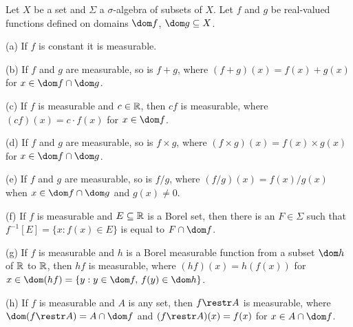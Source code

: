      
Let $X$ be a set and $\Sigma$ a $\sigma$-algebra
of subsets of $X$.   Let $f$ and $g$ be real-valued functions defined on
domains $\dom f$, $\dom g\subseteq X$.
     
(a) If $f$ is constant it is
measurable.
     
(b) If $f$ and $g$ are measurable, so is $f+g$, where
$(f+g)(x)=f(x)+g(x)$ for $x\in
\dom f\cap\dom g$.
     
(c) If $f$ is measurable and $c\in\Bbb R$, then $cf$ is measurable,
where
$(cf)(x)=c\cdot f(x)$ for $x\in \dom f$.
     
(d) If $f$ and $g$ are measurable, so is $f\times g$, where $(f\times
g)(x)=f(x)\times g(x)$ for $x\in \dom f\cap\dom g$.
     
(e) If $f$ and $g$ are measurable, so is $f/g$, where
$(f/g)(x)=f(x)/g(x)$ when
$x\in \dom f\cap\dom g$ and $g(x)\ne 0$.
     
(f) If $f$ is measurable and $E\subseteq\Bbb R$ is a Borel set, then
there is an
$F\in\Sigma$ such that $f^{-1}[E]=\{x:f(x)\in E\}$ is equal to $F\cap
\dom f$.
     
(g) If $f$ is measurable and $h$ is  a Borel measurable function from a
subset $\dom h$
of $\Bbb R$ to $\Bbb R$, then $hf$ is measurable, where
$(hf)(x)=h(f(x))$ for $x\in\dom(hf)=\{y:y\in\dom f,\,f(y)\in\dom h\}$.
     
(h) If $f$ is measurable and $A$ is any set, then $f\restr A$ is
measurable, where $\dom(f\restr A)=A\cap\dom f$ and
$(f\restr A)(x)=f(x)$ for $x\in A\cap\dom f$.
     
